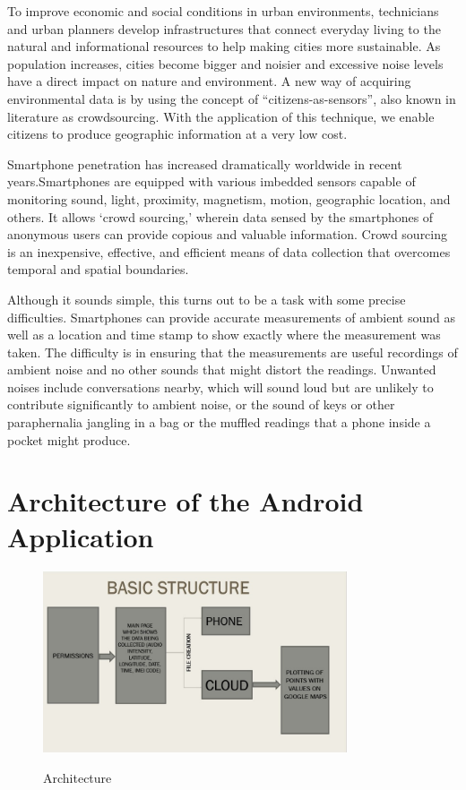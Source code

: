 To improve economic and social conditions in urban environments, technicians and urban planners develop infrastructures that connect everyday living to the natural and informational resources to help making cities more sustainable. As population increases, cities become bigger and noisier and excessive noise levels have a direct impact on nature and environment. A new way of acquiring environmental data is by using the concept of “citizens-as-sensors”, also known in literature as crowdsourcing. With the application of this technique, we enable citizens to produce geographic information at a very low cost.

Smartphone penetration has increased dramatically worldwide in recent years.Smartphones are equipped with various imbedded sensors capable of monitoring sound, light, proximity, magnetism, motion, geographic location, and others. It allows ‘crowd sourcing,’ wherein data sensed by the smartphones of anonymous users can provide copious and valuable information. Crowd sourcing is an inexpensive, effective, and efficient means of data collection that overcomes temporal and spatial boundaries.

Although it sounds simple, this turns out to be a task with some precise difficulties. Smartphones can provide accurate measurements of ambient sound as well as a location and time stamp to show exactly where the measurement was taken. The difficulty is in ensuring that the measurements are useful recordings of ambient noise and no other sounds that might distort the readings. Unwanted noises include conversations nearby, which will sound loud but are unlikely to contribute significantly to ambient noise, or the sound of keys or other paraphernalia jangling in a bag or the muffled readings that a phone inside a pocket might produce.

\section{Architecture of the Android Application}


\begin{figure}[!htbp]
	\includegraphics[width=0.8\textwidth]{3.jpg}
	\centering
	\label{fig:Architecture}
	\caption{Architecture}
\end{figure}

